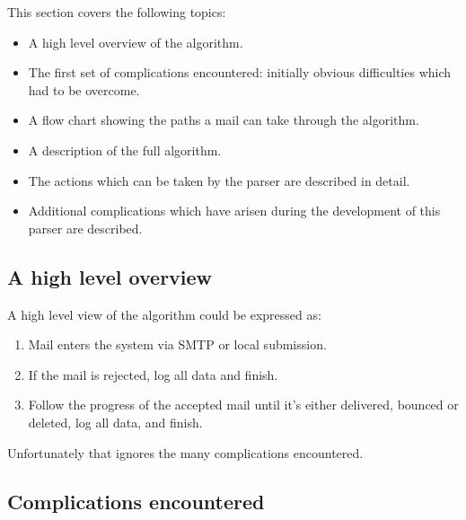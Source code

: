 \documentclass[a4paper,12pt,draft]{article}
\begin{document}
This section covers the following topics:

\begin{itemize}

    \item A high level overview of the algorithm.

    \item The first set of complications encountered: initially obvious
        difficulties which had to be overcome.

    \item A flow chart showing the paths a mail can take through the
        algorithm.

    \item A description of the full algorithm.

    \item The actions which can be taken by the parser are described in
        detail.

    \item Additional complications which have arisen during the development
        of this parser are described.

\end{itemize}

\subsection{A high level overview}

A high level view of the algorithm could be expressed as:

\begin{enumerate}

    \item Mail enters the system via SMTP or local submission.

    \item If the mail is rejected, log all data and finish.

    \item Follow the progress of the accepted mail until it's either
        delivered, bounced or deleted, log all data, and finish.

\end{enumerate}

Unfortunately that ignores the many complications encountered.


\subsection{Complications encountered}
\end{document}
